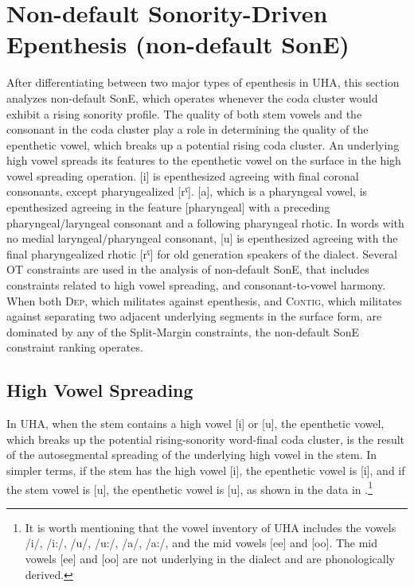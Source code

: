 \documentclass[output=paper,colorlinks,citecolor=brown]{langscibook}
\begin{document}
\section{Non-default Sonority-Driven Epenthesis (non-default SonE)}\label{sone}
After differentiating between two major types of epenthesis in UHA, this section analyzes non-default SonE, which operates whenever the coda cluster would exhibit a rising sonority profile. The quality of both stem vowels and the consonant in the coda cluster play a role in determining the quality of the epenthetic vowel, which breaks up a potential rising coda cluster. An underlying high vowel spreads its features to the epenthetic vowel on the surface in the high vowel spreading operation. [i] is epenthesized agreeing with final coronal consonants, except pharyngealized [rˤ]. [a], which is a pharyngeal vowel, is epenthesized agreeing in the feature [pharyngeal] with a preceding pharyngeal/laryngeal consonant and a following pharyngeal rhotic. In words with no medial laryngeal/pharyngeal consonant, [u] is epenthesized agreeing with the final pharyngealized rhotic [rˤ] for old generation speakers of the dialect. Several OT constraints are used in the analysis of non-default SonE, that includes constraints related to high vowel spreading, and consonant-to-vowel harmony. When both \textsc{Dep,} which militates against epenthesis, and \textsc{Contig,} which militates against separating two adjacent underlying segments in the surface form, are dominated by any of the Split-Margin constraints, the non-default SonE constraint ranking operates.

\subsection{High Vowel Spreading}
In UHA, when the stem contains a high vowel [i] or [u], the epenthetic vowel, which breaks up the potential rising-sonority word-final coda cluster, is the result of the autosegmental spreading  of the underlying high vowel in the stem. In simpler terms, if the stem has the high vowel [i], the epenthetic vowel is [i], and if the stem vowel is [u], the epenthetic vowel is [u], as shown in the data in .\footnote{It is worth mentioning that the vowel inventory of UHA includes the vowels /i/, /i:/, /u/, /u:/, /a/, /a:/, and the mid vowels [ee] and [oo]. The mid vowels [ee] and [oo] are not underlying in the dialect and are phonologically derived.}
\end{document}
